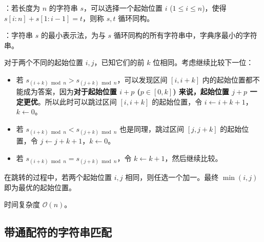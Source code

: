 ：若长度为 $n$ 的字符串 $s$，可以选择一个起始位置 $i$ ($1 \leq i \leq n$)，使得 $s[i : n] + s[1 : i - 1] = t$，则称 $s, t$ 循环同构。

：字符串 $s$ 的最小表示法，为与 $s$ 循环同构的所有字符串中，字典序最小的字符串。

对于两个不同的起始位置 $i, j$，已知它们的前 $k$ 位相同。考虑继续比较下一位：

\begin{itemize}
    \item 若 $s_{(i + k) \bmod n} > s_{(j + k) \bmod n}$，可以发现区间 $[i, i + k]$ 内的起始位置都不能成为答案，因为\textbf{对于起始位置 $i + p$ ($p \in [0, k]$) 来说，起始位置 $j + p$ 一定更优}。所以此时可以跳过区间 $[i, i + k]$ 的起始位置，令 $i \gets i + k + 1$，$k \gets 0$。
    \item 若 $s_{(i + k) \bmod n} < s_{(j + k) \bmod n}$ 也是同理，跳过区间 $[j, j + k]$ 的起始位置，令 $j \gets j + k + 1$，$k \gets 0$。
    \item 若 $s_{(i + k) \bmod n} = s_{(j + k) \bmod n}$，令 $k \gets k + 1$，然后继续比较。
\end{itemize}

在跳转的过程中，若两个起始位置 $i, j$ 相同，则任选一个加一。最终 $\min(i, j)$ 即为最优的起始位置。

时间复杂度 $\mathcal{O}(n)$。


\subsection{带通配符的字符串匹配}